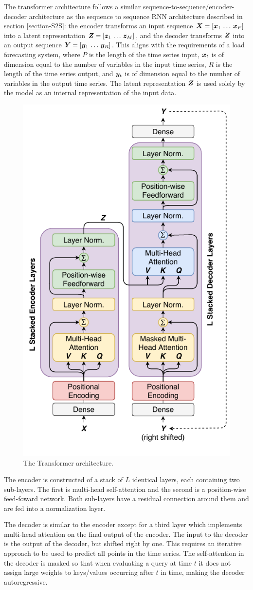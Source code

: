 The transformer architecture follows a similar sequence-to-sequence/encoder-decoder architecture as the sequence to sequence RNN architecture described in section \ref{section-S2S}: the encoder transforms an input sequence ${\bm{X}} = [{\bm{x}}_1 \, \ldots \, {\bm{x}}_P]$ into a latent representation ${\bm{Z}} = [{\bm{z}}_1 \, \ldots \, {\bm{z}}_M]$, and the decoder transforms ${\bm{Z}}$ into an output sequence ${\bm{Y}} = [{\bm{y}}_1 \, \ldots \, {\bm{y}}_R]$.
This aligns with the requirements of a load forecasting system, where $P$ is the length of the time series input, ${\bm{x}}_t$ is of dimension equal to the number of variables in the input time series, $R$ is the length of the time series output, and ${\bm{y}}_t$ is of dimension equal to the number of variables in the output time series.
The latent representation ${\bm{Z}}$ is used solely by the model as an internal representation of the input data.

\begin{figure}[htbp]
	\centerline{\includegraphics[trim=0 0cm 0 0, width=.4\textwidth]{images/transformer.pdf}}
	\caption{The Transformer architecture.}
	\label{fig:transformer}
\end{figure}

The encoder is constructed of a stack of $L$ identical layers, each containing two sub-layers.
The first is multi-head self-attention and the second is a position-wise feed-foward network.
Both sub-layers have a residual connection around them and are fed into a normalization layer.

The decoder is similar to the encoder except for a third layer which implements multi-head attention on the final output of the encoder.
The input to the decoder is the output of the decoder, but shifted right by one.
This requires an iterative approach to be used to predict all points in the time series.
The self-attention in the decoder is masked so that when evaluating a query at time $t$ it does not assign large weights to keys/values occurring after $t$ in time, making the decoder autoregressive.

